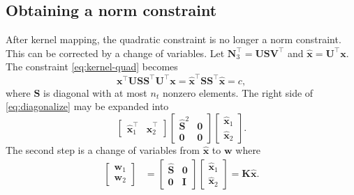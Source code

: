 \documentclass[journal,twoside]{IEEEtran}
\renewcommand{\vec}[1]{\mathbf{#1}}
\begin{document}
\subsection{Obtaining a norm constraint}\label{sec:solution-norm}
After kernel mapping, the quadratic constraint is no longer a norm constraint. This can be corrected by a change of variables. Let $\mathbf{N}_3^\top = \mathbf{USV}^\top$ and $\hat{\mathbf{x}}=\mathbf{U}^\top\mathbf{x}$. The constraint \eqref{eq:kernel-quad} becomes
\begin{equation}
\label{eq:diagonalize} \vec{x}^\top  \mathbf{US}\mathbf
{S}^\top\mathbf{U^\top} \vec{x} = \hat{\mathbf{x}}^\top\mathbf{SS}^\top \hat{\mathbf{x}}=c,
\end{equation}
where $\mathbf{S}$ is diagonal with at most $n_t$ nonzero elements. The right side of \eqref{eq:diagonalize} may be expanded into
\begin{equation}\label{eq:diagonalize2}
\begin{bmatrix}
\hat{\vec{x}}_1^\top & \hat{\vec{x}}_2^\top \end{bmatrix}
\begin{bmatrix} \hat{\mathbf{S}}^2 & \mathbf{0} \\ \mathbf{0} & \mathbf{0} \end{bmatrix}
\begin{bmatrix}
\hat{\vec{x}}_1 \\ \hat{\vec{x}}_2
\end{bmatrix}.
\end{equation}
The second step is a change of variables from $\hat{\vec{x}}$ to $\vec{w}$ where
\begin{align}
\label{eq:x_to_w} \begin{bmatrix} \vec{w}_1 \\ \vec{w}_2 \end{bmatrix} &=
\begin{bmatrix} \hat{\mathbf{S}} & \mathbf{0} \\ \mathbf{0} & \mathbf{I} \end{bmatrix}
\begin{bmatrix} \hat{\vec{x}}_1 \\ \hat{\vec{x}}_2 \end{bmatrix} = \mathbf{K}\hat{\vec{x}}.
\end{align}
\end{document}
